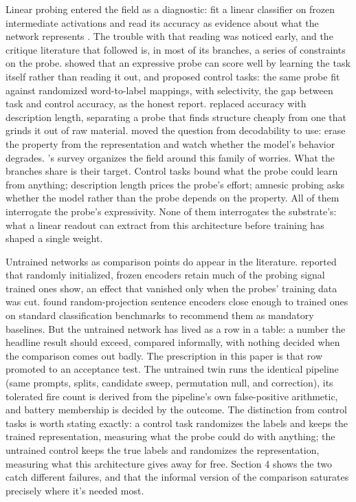 Linear probing entered the field as a diagnostic: fit a linear
classifier on frozen intermediate activations and read its accuracy as
evidence about what the network represents \citep{alain2016probes}.
The trouble with that reading was noticed early, and the critique
literature that followed is, in most of its branches, a series of
constraints on the probe. \citet{hewitt2019designing} showed that an
expressive probe can score well by learning the task itself rather than
reading it out, and proposed control tasks: the same probe fit against
randomized word-to-label mappings, with selectivity, the gap between
task and control accuracy, as the honest report. \citet{voita2020mdl}
replaced accuracy with description length, separating a probe that
finds structure cheaply from one that grinds it out of raw material.
\citet*{elazar2020amnesic} moved the question from
decodability to use: erase the property from the representation and
watch whether the model's behavior degrades. \citeauthor{belinkov2021probing}'s \citeyearpar{belinkov2021probing} survey
organizes the field around this family of worries. What the branches
share is their target. Control tasks bound what the probe could learn
from anything; description length prices the probe's effort; amnesic
probing asks whether the model rather than the probe depends on the
property. All of them interrogate the probe's expressivity. None of
them interrogates the substrate's: what a linear readout can extract
from this architecture before training has shaped a single weight.

Untrained networks as comparison points do appear in the literature.
\citet{zhang2018lm} reported that randomly initialized, frozen
encoders retain much of the probing signal trained ones show, an effect
that vanished only when the probes' training data was cut. \citet{wieting2019notraining} found random-projection sentence encoders close enough to
trained ones on standard classification benchmarks to recommend them as
mandatory baselines. But the untrained network has lived as a row in a
table: a number the headline result should exceed, compared informally,
with nothing decided when the comparison comes out badly. The
prescription in this paper is that row promoted to an acceptance test.
The untrained twin runs the identical pipeline (same prompts, splits,
candidate sweep, permutation null, and correction), its tolerated fire
count is derived from the pipeline's own false-positive arithmetic, and
battery membership is decided by the outcome. The distinction from
control tasks is worth stating exactly: a control task randomizes the
labels and keeps the trained representation, measuring what the probe
could do with anything; the untrained control keeps the true labels and
randomizes the representation, measuring what this architecture gives
away for free. Section 4 shows the two catch different failures, and
that the informal version of the comparison saturates precisely where
it's needed most.

